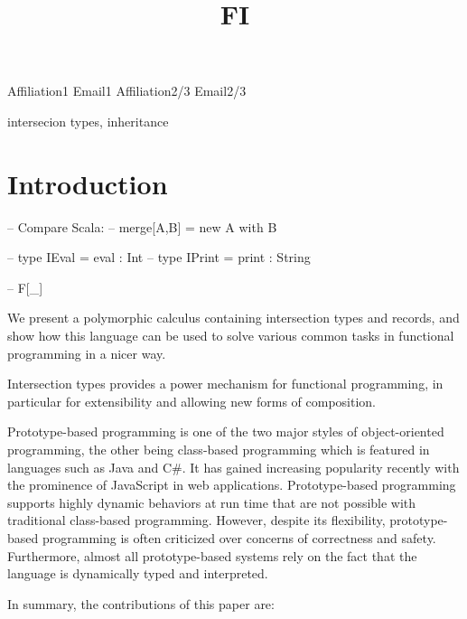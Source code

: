 \documentclass[preprint]{sigplanconf}
\newcommand{\FI}{{\bf FI} }
\begin{document}
\setlength{\pdfpageheight}{\paperheight}
\setlength{\pdfpagewidth}{\paperwidth}

\title{\FI}

           {Affiliation1}
           {Email1}
           {Affiliation2/3}
           {Email2/3}

\maketitle

\begin{abstract}
\end{abstract}

\keywords
intersecion types, inheritance

\section{Introduction}

-- Compare Scala:
-- merge[A,B] = new A with B

-- type IEval  = { eval :  Int }
-- type IPrint = { print : String }

-- F[\_]

We present a polymorphic calculus containing intersection types and records, and show
how this language can be used to solve various common tasks in functional
programming in a nicer way.

Intersection types provides a power mechanism for functional programming, in
particular for extensibility and allowing new forms of composition.

Prototype-based programming is one of the two major styles of object-oriented
programming, the other being class-based programming which is featured in
languages such as Java and C\#. It has gained increasing popularity recently
with the prominence of JavaScript in web applications. Prototype-based
programming supports highly dynamic behaviors at run time that are not possible
with traditional class-based programming. However, despite its flexibility,
prototype-based programming is often criticized over concerns of correctness and
safety. Furthermore, almost all prototype-based systems rely on the fact that
the language is dynamically typed and interpreted.

In summary, the contributions of this paper are:
\end{document}
